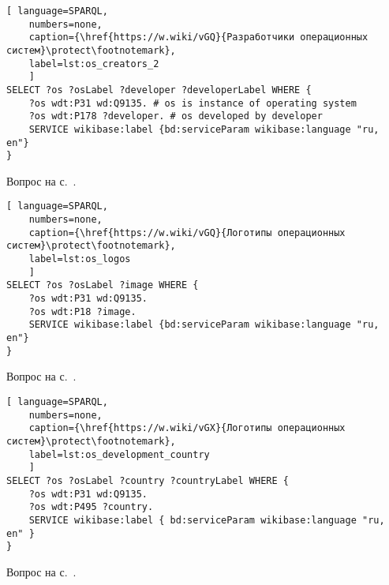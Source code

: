 \newpage
\begin{task}
	\label{answer:os_and_developers}

\begin{lstlisting}[ language=SPARQL, 
    numbers=none,
    caption={\href{https://w.wiki/vGQ}{Разработчики операционных систем}\protect\footnotemark},
    label=lst:os_creators_2
	]
SELECT ?os ?osLabel ?developer ?developerLabel WHERE {
    ?os wdt:P31 wd:Q9135. # os is instance of operating system
    ?os wdt:P178 ?developer. # os developed by developer
    SERVICE wikibase:label {bd:serviceParam wikibase:language "ru, en"}
}\end{lstlisting}

\small{\AnswerBackref Вопрос на с.~\pageref{tasks:operating_system_tasks}.}
\end{task}


\begin{task}
\label{answer:os_and_logos}

\begin{lstlisting}[ language=SPARQL, 
    numbers=none,
    caption={\href{https://w.wiki/vGQ}{Логотипы операционных систем}\protect\footnotemark},
    label=lst:os_logos
	]
SELECT ?os ?osLabel ?image WHERE {
    ?os wdt:P31 wd:Q9135.
    ?os wdt:P18 ?image.
    SERVICE wikibase:label {bd:serviceParam wikibase:language "ru, en"}
}\end{lstlisting}

\small{\AnswerBackref Вопрос на с.~\pageref{tasks:operating_system_tasks}.}
\end{task}

\begin{task}
\label{answer:os_country}

\begin{lstlisting}[ language=SPARQL, 
    numbers=none,
    caption={\href{https://w.wiki/vGX}{Логотипы операционных систем}\protect\footnotemark},
	label=lst:os_development_country
	]
SELECT ?os ?osLabel ?country ?countryLabel WHERE {
	?os wdt:P31 wd:Q9135.
	?os wdt:P495 ?country.
	SERVICE wikibase:label { bd:serviceParam wikibase:language "ru, en" }
}\end{lstlisting}

\small{\AnswerBackref Вопрос на с.~\pageref{tasks:operating_system_tasks}.}
\end{task}



